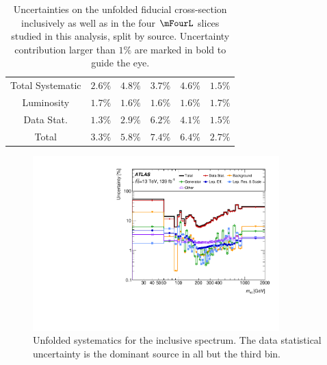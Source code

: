 \begin{table}
\begin{tabular} {c  c  c  c  c  c }
        \hline 
        Total Systematic &  $ 2.6\% $  &  $ 4.8\% $  &  $ 3.7\% $  &  $ 4.6\% $  &  $ 1.5\% $ \\
        Luminosity &  $ \mathbf{1.7}\% $  &  $ \mathbf{1.6}\% $  &  $ \mathbf{1.6}\% $  &  $ \mathbf{1.6}\% $  &  $ \mathbf{1.7}\% $ \\
        Data Stat. &  $ \mathbf{1.3}\% $  &  $ \mathbf{2.9}\% $  &  $ \mathbf{6.2}\% $  &  $ \mathbf{4.1}\% $  &  $ \mathbf{1.5}\% $ \\
        \hline 
        Total &  $ 3.3\% $  &  $ 5.8\% $  &  $ 7.4\% $  &  $ 6.4\% $  &  $ 2.7\% $ \\
        \hline 
     \end{tabular}
    \caption{Uncertainties on the unfolded fiducial cross-section inclusively as well as in the four $\mFourL$ slices studied in this analysis, split by source. Uncertainty contribution larger than $1\%$ are marked in bold to guide the eye.  \label{tab:SysTablePerSlice} }
\end{table}

\begin{figure}
    \centering
    \includegraphics[width=0.85\textwidth]{Figures/m4l/Systematics/UnfoldedSys_M4l_Stack_Paper.pdf}
    \caption{Unfolded systematics for the inclusive \mFourL spectrum. The data statistical uncertainty is the dominant source in all but the third bin. }
    \label{fig:m4lsystematics}
\end{figure}